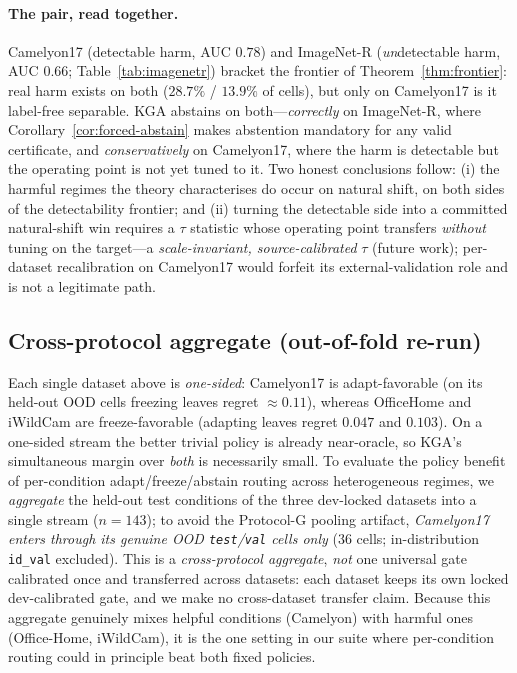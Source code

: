 \documentclass[conference]{IEEEtran}
\theoremstyle{plain}
\theoremstyle{definition}
\begin{document}
\paragraph{The pair, read together.} Camelyon17 (detectable harm, AUC $0.78$) and ImageNet-R
(\emph{un}detectable harm, AUC $0.66$; Table~\ref{tab:imagenetr}) bracket the frontier of
Theorem~\ref{thm:frontier}: real harm exists on both ($28.7\%$ / $13.9\%$ of cells), but only on
Camelyon17 is it label-free separable. \textsc{KGA} abstains on both---\emph{correctly} on
ImageNet-R, where Corollary~\ref{cor:forced-abstain} makes abstention mandatory for any valid
certificate, and \emph{conservatively} on Camelyon17, where the harm is detectable but the
operating point is not yet tuned to it. Two honest conclusions follow: (i) the harmful regimes the
theory characterises do occur on natural shift, on both sides of the detectability frontier; and
(ii) turning the detectable side into a committed natural-shift win requires a $\tau$ statistic
whose operating point transfers \emph{without} tuning on the target---a \emph{scale-invariant,
source-calibrated} $\tau$ (future work); per-dataset recalibration on Camelyon17 would forfeit its
external-validation role and is not a legitimate path.

\subsection{Cross-protocol aggregate (out-of-fold re-run)}\label{sec:mixedstream}
Each single dataset above is \emph{one-sided}: Camelyon17 is adapt-favorable
(on its held-out OOD cells freezing leaves regret ${\approx}0.11$), whereas OfficeHome and
iWildCam are freeze-favorable (adapting leaves regret $0.047$ and $0.103$). On a one-sided
stream the better trivial policy is already near-oracle, so \textsc{KGA}'s simultaneous margin
over \emph{both} is necessarily small. To evaluate the policy benefit of per-condition
adapt/freeze/abstain routing across heterogeneous regimes, we \emph{aggregate} the held-out test
conditions of the three dev-locked datasets into a single stream ($n{=}143$); to avoid the
Protocol-G pooling artifact, \emph{Camelyon17 enters through its genuine OOD \texttt{test}/\texttt{val}
cells only} ($36$ cells; in-distribution \texttt{id\_val} excluded). This is a \emph{cross-protocol
aggregate}, \emph{not} one universal gate calibrated once and transferred across datasets: each
dataset keeps its own locked dev-calibrated gate, and we make no cross-dataset transfer claim.
Because this aggregate genuinely mixes helpful conditions (Camelyon) with harmful ones (Office-Home,
iWildCam), it is the one setting in our suite where per-condition routing could in principle beat
both fixed policies.
\end{document}
